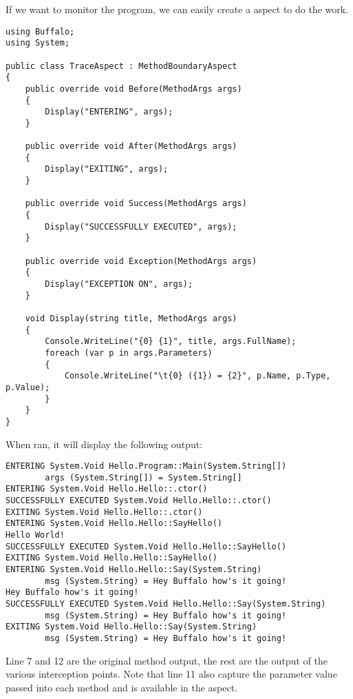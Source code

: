 If we want to monitor the program, we can easily create a aspect to do the work.

\begin{lstlisting}[caption={TraceAspect}, label=traceaspect, frame=tb, basicstyle=\scriptsize]
using Buffalo;
using System;

public class TraceAspect : MethodBoundaryAspect
{
    public override void Before(MethodArgs args)
    {
        Display("ENTERING", args);
    }

    public override void After(MethodArgs args)
    {
        Display("EXITING", args);
    }

    public override void Success(MethodArgs args)
    {
        Display("SUCCESSFULLY EXECUTED", args);
    }

    public override void Exception(MethodArgs args)
    {
        Display("EXCEPTION ON", args);
    }

    void Display(string title, MethodArgs args)
    {
        Console.WriteLine("{0} {1}", title, args.FullName);
        foreach (var p in args.Parameters)
        {
            Console.WriteLine("\t{0} ({1}) = {2}", p.Name, p.Type, p.Value);
        }
    }
}
\end{lstlisting}

When ran, it will display the following output:

\begin{lstlisting}[caption={TraceAspect output}, label=traceaspectout, frame=tb, basicstyle=\scriptsize]
ENTERING System.Void Hello.Program::Main(System.String[])
        args (System.String[]) = System.String[]
ENTERING System.Void Hello.Hello::.ctor()
SUCCESSFULLY EXECUTED System.Void Hello.Hello::.ctor()
EXITING System.Void Hello.Hello::.ctor()
ENTERING System.Void Hello.Hello::SayHello()
Hello World!
SUCCESSFULLY EXECUTED System.Void Hello.Hello::SayHello()
EXITING System.Void Hello.Hello::SayHello()
ENTERING System.Void Hello.Hello::Say(System.String)
        msg (System.String) = Hey Buffalo how's it going!
Hey Buffalo how's it going!
SUCCESSFULLY EXECUTED System.Void Hello.Hello::Say(System.String)
        msg (System.String) = Hey Buffalo how's it going!
EXITING System.Void Hello.Hello::Say(System.String)
        msg (System.String) = Hey Buffalo how's it going!
\end{lstlisting}

Line 7 and 12 are the original method output, the rest are the output of the various interception points. Note that line 11 also capture the parameter value passed into each method and is available in the aspect.
